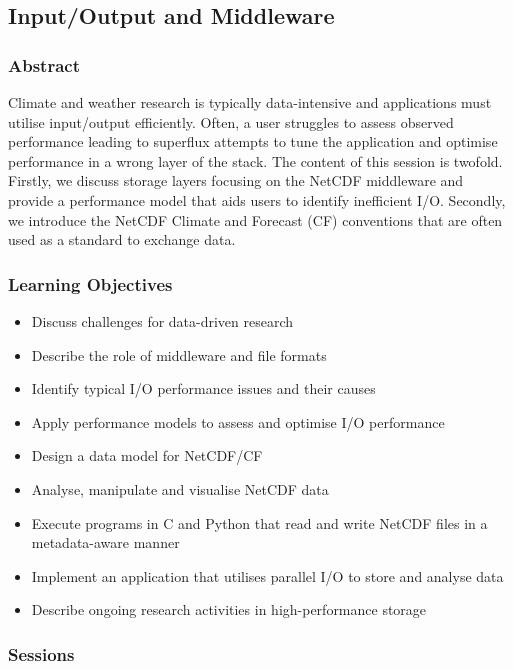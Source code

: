 \subsection{Input/Output and Middleware}

\subsubsection{Abstract}

Climate and weather research is typically data-intensive and applications must utilise input/output efficiently. Often, a user struggles to assess observed performance leading to superflux attempts to tune the application and optimise performance in a wrong layer of the stack. The content of this session is twofold. Firstly, we discuss storage layers focusing on the NetCDF middleware and provide a performance model that aids users to identify inefficient I/O. Secondly, we introduce the NetCDF Climate and Forecast (CF) conventions that are often used as a standard to exchange data.

\subsubsection{Learning Objectives}

\begin{itemize}

\item Discuss challenges for data-driven research
\item Describe the role of middleware and file formats
\item Identify typical I/O performance issues and their causes
\item Apply performance models to assess and optimise I/O performance
\item Design a data model for NetCDF/CF
\item Analyse, manipulate and visualise NetCDF data
\item Execute programs in C and Python that read and write NetCDF files in a metadata-aware manner
\item Implement an application that utilises parallel I/O to store and analyse data
\item Describe ongoing research activities in high-performance storage

\end{itemize}

\subsubsection{Sessions}

